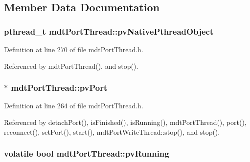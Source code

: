 \subsection{Member Data Documentation}
\hypertarget{classmdt_port_thread_a7154af7d387eecaea113ddb5900ff23c}{
\subsubsection[{pv\-Native\-Pthread\-Object}]{\setlength{\rightskip}{0pt plus 5cm}pthread\-\_\-t mdt\-Port\-Thread\-::pv\-Native\-Pthread\-Object\hspace{0.3cm}{\ttfamily [protected]}}}\label{classmdt_port_thread_a7154af7d387eecaea113ddb5900ff23c}


Definition at line 270 of file mdt\-Port\-Thread.\-h.



Referenced by mdt\-Port\-Thread(), and stop().

\hypertarget{classmdt_port_thread_af5c4bed0c9fb012f220fba013d0f69b8}{
\subsubsection[{pv\-Port}]{$\ast$ mdt\-Port\-Thread\-::pv\-Port\hspace{0.3cm}{\ttfamily [protected]}}}\label{classmdt_port_thread_af5c4bed0c9fb012f220fba013d0f69b8}


Definition at line 264 of file mdt\-Port\-Thread.\-h.



Referenced by detach\-Port(), is\-Finished(), is\-Running(), mdt\-Port\-Thread(), port(), reconnect(), set\-Port(), start(), mdt\-Port\-Write\-Thread\-::stop(), and stop().

\hypertarget{classmdt_port_thread_a59735ef01b761361b1055a0356be525a}{
\subsubsection[{pv\-Running}]{\setlength{\rightskip}{0pt plus 5cm}volatile bool mdt\-Port\-Thread\-::pv\-Running\hspace{0.3cm}{\ttfamily [protected]}}}\label{classmdt_port_thread_a59735ef01b761361b1055a0356be525a}


